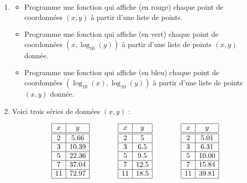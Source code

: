 \documentclass[11pt,class=report,crop=false]{standalone}
\begin{document}
\begin{activite}



  \begin{enumerate}
    \item 
    \begin{itemize}
      \item Programme une fonction  qui affiche (en rouge) chaque point de coordonnées $(x,y)$ à partir d'une liste de points.
      \item Programme une fonction  qui affiche (en vert) chaque point de coordonnées $(x,\log_{10}(y))$ à partir d'une liste de points $(x,y)$ donnée.
      \item Programme une fonction  qui affiche (en bleu) chaque point de coordonnées $(\log_{10}(x),\log_{10}(y))$ à partir d'une liste de points $(x,y)$ donnée.
    \end{itemize}
    
        
    \item  Voici trois séries de données $(x,y)$ :
    
    $$
     \begin{array}{|c|c|}
    \hline
    x & y \\ \hline\hline
    2 & 5.66 \\ \hline
    3 & 10.39 \\ \hline
    5 & 22.36 \\ \hline
    7 & 37.04 \\ \hline
    11 & 72.97 \\ \hline                
    \end{array}\qquad \qquad  
    \begin{array}{|c|c|}
    \hline
    x & y \\ \hline\hline
    2 & 5 \\ \hline
    3 & 6.5 \\ \hline
    5 & 9.5 \\ \hline
    7 & 12.5 \\ \hline
    11 & 18.5 \\ \hline                
    \end{array}\qquad \qquad
    \begin{array}{|c|c|}
    \hline
    x & y \\ \hline\hline
    2 & 5.01 \\ \hline
    3 & 6.31 \\ \hline
    5 & 10.00 \\ \hline
    7 & 15.84 \\ \hline
    11 & 39.81 \\ \hline                
    \end{array}  
    $$    
    

\end{enumerate}
\end{activite}
\end{document}

